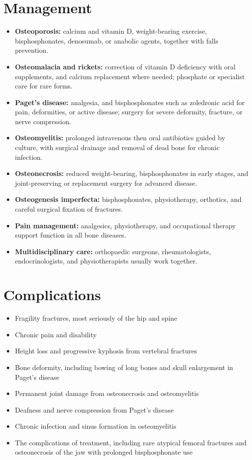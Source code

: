 \section*{Management}
\begin{itemize}
    \item \textbf{Osteoporosis:} calcium and vitamin D, weight-bearing exercise, bisphosphonates, denosumab, or anabolic agents, together with falls prevention.
    \item \textbf{Osteomalacia and rickets:} correction of vitamin D deficiency with oral supplements, and calcium replacement where needed; phosphate or specialist care for rare forms.
    \item \textbf{Paget's disease:} analgesia, and bisphosphonates such as zoledronic acid for pain, deformities, or active disease; surgery for severe deformity, fracture, or nerve compression.
    \item \textbf{Osteomyelitis:} prolonged intravenous then oral antibiotics guided by culture, with surgical drainage and removal of dead bone for chronic infection.
    \item \textbf{Osteonecrosis:} reduced weight-bearing, bisphosphonates in early stages, and joint-preserving or replacement surgery for advanced disease.
    \item \textbf{Osteogenesis imperfecta:} bisphosphonates, physiotherapy, orthotics, and careful surgical fixation of fractures.
    \item \textbf{Pain management:} analgesics, physiotherapy, and occupational therapy support function in all bone diseases.
    \item \textbf{Multidisciplinary care:} orthopaedic surgeons, rheumatologists, endocrinologists, and physiotherapists usually work together.
\end{itemize}

\section*{Complications}
\begin{itemize}
    \item Fragility fractures, most seriously of the hip and spine
    \item Chronic pain and disability
    \item Height loss and progressive kyphosis from vertebral fractures
    \item Bone deformity, including bowing of long bones and skull enlargement in Paget's disease
    \item Permanent joint damage from osteonecrosis and osteomyelitis
    \item Deafness and nerve compression from Paget's disease
    \item Chronic infection and sinus formation in osteomyelitis
    \item The complications of treatment, including rare atypical femoral fractures and osteonecrosis of the jaw with prolonged bisphosphonate use
\end{itemize}

